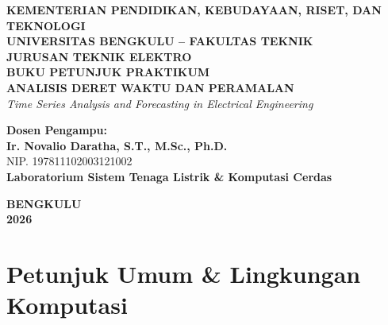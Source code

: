 \documentclass[11pt,a4paper]{report}
\begin{document}
\begin{titlepage}
    \begin{center}
        \vspace*{0.5cm}
        {\LARGE \textbf{\color{mainblue}KEMENTERIAN PENDIDIKAN, KEBUDAYAAN, RISET, DAN TEKNOLOGI}}\\[0.2cm]
        {\Large \textbf{\color{mainblue}UNIVERSITAS BENGKULU -- FAKULTAS TEKNIK}}\\[0.2cm]
        {\large \textbf{\color{secblue}JURUSAN TEKNIK ELEKTRO}}\\[2.5cm]

        {\Huge \textbf{\color{mainblue}BUKU PETUNJUK PRAKTIKUM}}\\[0.4cm]
        {\LARGE \textbf{\color{secblue}ANALISIS DERET WAKTU DAN PERAMALAN}}\\[0.2cm]
        {\large \textit{Time Series Analysis and Forecasting in Electrical Engineering}}\\[2cm]

        \begin{tcolorbox}[width=13cm,colback=boxbg,colframe=secblue,center]
            \centering
            \textbf{Dosen Pengampu:}\\[0.1cm]
            \textbf{\Large Ir. Novalio Daratha, S.T., M.Sc., Ph.D.}\\[0.1cm]
            \small NIP. 197811102003121002\\[0.3cm]
            \textbf{Laboratorium Sistem Tenaga Listrik \& Komputasi Cerdas}
        \end{tcolorbox}

        \vfill
        {\large \textbf{BENGKULU}}\\[0.1cm]
        {\large \textbf{2026}}
    \end{center}
\end{titlepage}

\tableofcontents
\newpage
{}

\chapter*{Petunjuk Umum \& Lingkungan Komputasi}
\end{document}
